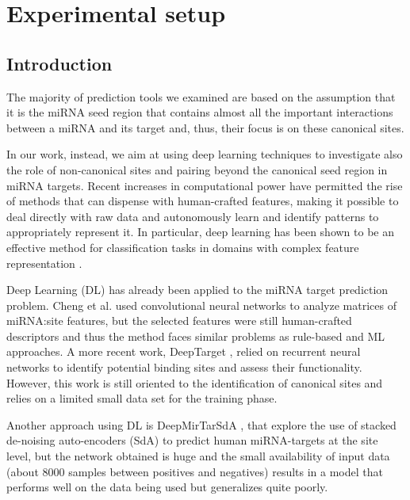 
\chapter{Experimental setup} %

\label{Chapter4} %



\section{Introduction}
The majority of prediction tools we examined are based on the assumption that it is the miRNA seed region that contains almost all the important interactions between a miRNA and its target and, thus, their focus is on these canonical sites.

In our work, instead, we aim at using deep learning techniques to investigate also the role of non-canonical sites and pairing beyond the canonical seed region in miRNA targets. Recent increases in computational power have permitted the rise of methods that can dispense with human-crafted features, making it possible to deal directly with raw data and autonomously learn and identify patterns to appropriately represent it. In particular, deep learning has been shown to be an effective method for classification tasks in domains with complex feature representation \cite{dl}.

Deep Learning (DL) has already been applied to the miRNA target prediction problem. Cheng et al. \cite{mirtdl} used convolutional neural networks to analyze matrices of miRNA:site features, but the selected features were still human-crafted descriptors and thus the method faces similar problems as rule-based and ML approaches. A more recent work, DeepTarget \cite{deep_target}, relied on recurrent neural networks to identify potential binding sites and assess their functionality. However, this work is still oriented to the identification of canonical sites and relies on a limited small data set for the training phase. 

Another approach using DL is DeepMirTarSdA \cite{deep_mirtar}, that explore the use of stacked de-noising auto-encoders (SdA) to predict human miRNA-targets at the site level, but the network obtained is huge and the small availability of input data (about 8000 samples between positives and negatives) results in a model that performs well on the data being used but generalizes quite poorly. 

